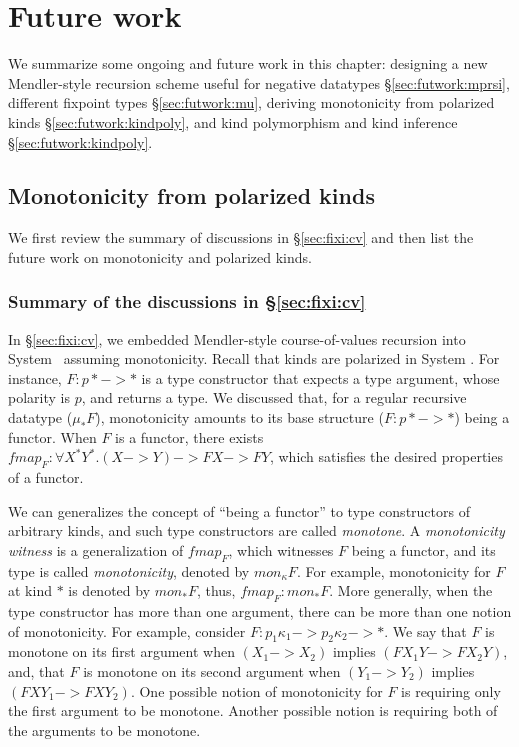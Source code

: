 \chapter{Future work}\label{ch:futwork}
We summarize some ongoing and future work in this chapter:
designing a new Mendler-style recursion scheme
useful for negative datatypes \S\ref{sec:futwork:mprsi},
different fixpoint types \S\ref{sec:futwork:mu},
deriving monotonicity from polarized kinds \S\ref{sec:futwork:kindpoly}, and
kind polymorphism and kind inference \S\ref{sec:futwork:kindpoly}.



\section{Monotonicity from polarized kinds}\label{sec:futwork:mon}
We first review the summary of discussions in \S\ref{sec:fixi:cv}
and then list the future work on monotonicity and polarized kinds.

\subsection*{Summary of the discussions in \S\ref{sec:fixi:cv}}
In \S\ref{sec:fixi:cv}, we embedded Mendler-style course-of-values recursion
into System \Fixi\ assuming monotonicity. Recall that kinds are polarized in
System \Fixi. For instance, $F: p* -> *$ is a type constructor that expects
a type argument, whose polarity is $p$, and returns a type. We discussed that,
for a regular recursive datatype ($\mu_{*} F$), monotonicity amounts to
its base structure ($F:p* -> *$) being a functor. When $F$ is a functor,
there exists $\textit{fmap}_F : \forall X^{*} Y^{*}. (X -> Y) -> F X -> F Y$,
which satisfies the desired properties of a functor.

We can generalizes the concept of ``being a functor''
to type constructors of arbitrary kinds, and such
type constructors are called \emph{monotone}.
A \emph{monotonicity witness} is a generalization of $\textit{fmap}_F$,
which witnesses $F$ being a functor, and its type is called \emph{monotonicity},
denoted by $\textit{mon}_{\kappa}F$. For example, monotonicity for $F$
at kind $*$ is denoted by $mon_{*}F$, thus, $\textit{fmap}_F : mon_{*} F$.
More generally, when the type constructor has more than one argument,
there can be more than one notion of monotonicity.
For example, consider $F : p_1\kappa_1 -> p_2\kappa_2 -> *$.
We say
that $F$ is monotone on its first argument
when $(X_1 -> X_2)$ implies $(F X_1 Y -> F X_2 Y)$, and,
that $F$ is monotone on its second argument
when $(Y_1 -> Y_2)$ implies $(F X Y_1 -> F X Y_2)$.
One possible notion of monotonicity for $F$ is requiring only the first
argument to be monotone. Another possible notion is requiring both of
the arguments to be monotone.

